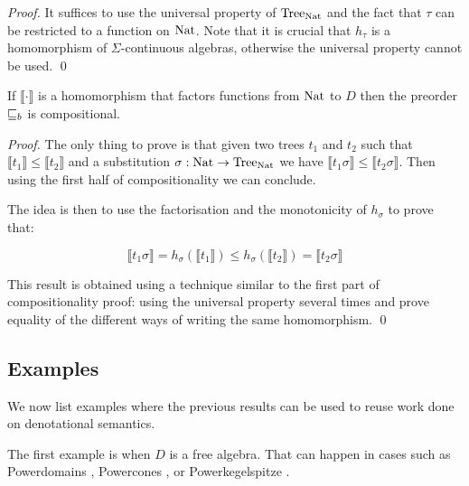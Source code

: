 \begin{proof}
    It suffices to use the universal property of $\textnormal{Tree}_{\textnormal{Nat}}$ 
    and the fact that $\tau$ can be restricted to a function 
    on $\textnormal{Nat}$. Note that it is crucial that $h_\tau$ is a 
    homomorphism of $\Sigma$-continuous algebras, 
    otherwise the universal property cannot be used.
\qed\end{proof}


\begin{alemma}
    If $\llbracket \cdot \rrbracket$ is a homomorphism 
    that factors functions from $\textnormal{Nat}$ to $D$ then 
    the preorder $\sqsubseteq_b$ is compositional.
\end{alemma}


\begin{proof}
    The only thing to prove is that given two trees $t_1$ and 
    $t_2$ such that $\llbracket t_1 \rrbracket \leq \llbracket t_2 \rrbracket$
    and a substitution $\sigma : \textnormal{Nat} \to \textnormal{Tree}_{\textnormal{Nat}}$ 
    we have $\llbracket t_1 \sigma \rrbracket \leq \llbracket t_2 \sigma
    \rrbracket$. 
    Then using the first half of compositionality we can conclude.

    The idea is then to use the factorisation and 
    the monotonicity of $h_\sigma$ to prove that:

    \begin{equation*}
        \llbracket t_1 \sigma \rrbracket 
        = h_\sigma (\llbracket t_1 \rrbracket) 
        \leq h_\sigma (\llbracket t_2 \rrbracket)
        = \llbracket t_2 \sigma \rrbracket 
    \end{equation*}

    This result is obtained using a technique similar 
    to the first part of compositionality proof: using 
    the universal property several times and prove 
    equality of the different ways of writing 
    the same homomorphism.
\qed\end{proof}


\subsection{Examples}

We now list examples where the previous results can be used 
to reuse work done on denotational semantics.

The first example is when $D$ is a free algebra. That 
can happen in cases such as Powerdomains 
\cite{abramsky1994}, Powercones \cite{tix2009semantic}, 
or Powerkegelspitze \cite{KeimelP2016}.

